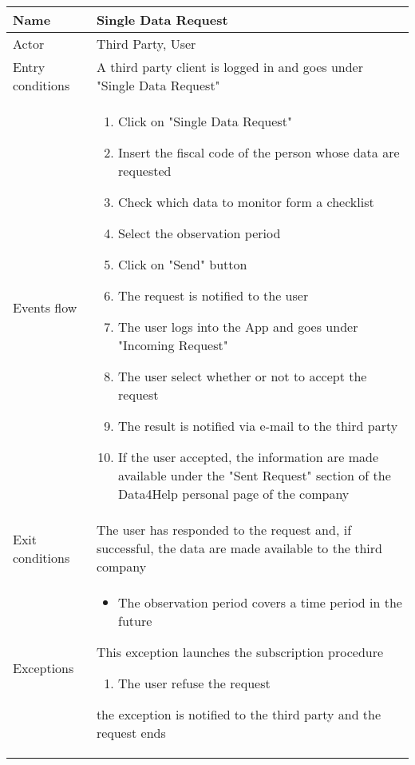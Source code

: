 \begin{table}[]
\begin{tabular}{|l|l|}
\hline
Name             & Single Data Request \\ \hline
Actor            & Third Party, User \\ \hline
Entry conditions & A third party client is logged in and goes under "Single Data Request"  \\ \hline
Events flow      & \begin{enumerate}
\item Click on "Single Data Request"
\item Insert the fiscal code of the person whose data are requested
\item Check which data to monitor form a checklist
\item Select the observation period
\item Click on "Send" button
\item The request is notified to the user
\item The user logs into the App and goes under "Incoming Request"
\item The user select whether or not to accept the request
\item The result is notified via e-mail to the third party
\item If the user accepted, the information are made available under the "Sent Request" section of the Data4Help personal page of the company
\end{enumerate} \\ \hline
Exit conditions  & The user has responded to the request and, if successful, the data are made available to the third company \\ \hline
Exceptions       & \begin{itemize}
\item The observation period covers a time period in the future
\end{itemize} This exception launches the subscription procedure
\begin{enumerate}
\item The user refuse the request
\end{enumerate} the exception is notified to the third party and the request ends\\  \hline
\end{tabular}
\end{table}

